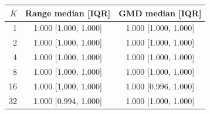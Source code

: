 \begin{tabular}{rcc}
\toprule
$K$ & Range median [IQR] & GMD median [IQR] \\
\midrule
1 & 1.000 [1.000, 1.000] & 1.000 [1.000, 1.000] \\
2 & 1.000 [1.000, 1.000] & 1.000 [1.000, 1.000] \\
4 & 1.000 [1.000, 1.000] & 1.000 [1.000, 1.000] \\
8 & 1.000 [1.000, 1.000] & 1.000 [1.000, 1.000] \\
16 & 1.000 [1.000, 1.000] & 1.000 [0.996, 1.000] \\
32 & 1.000 [0.994, 1.000] & 1.000 [1.000, 1.000] \\
\bottomrule
\end{tabular}
